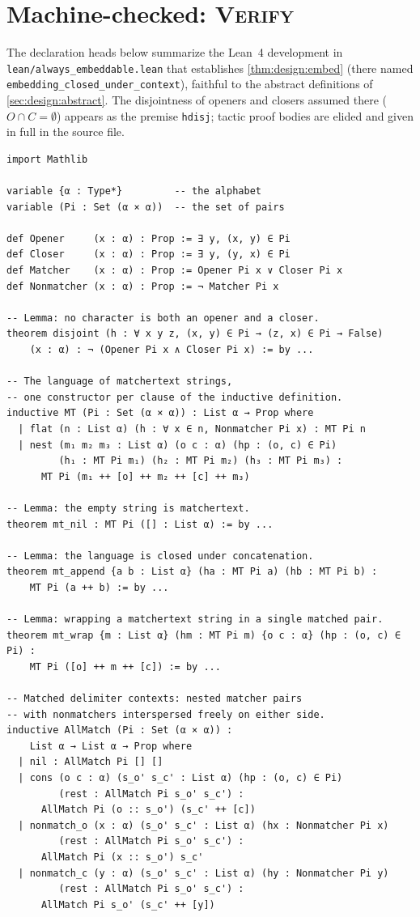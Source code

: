 \section{Machine-checked: \textsc{Verify}}
\label{app:lean}

The declaration heads below summarize the Lean~4 development in
\nolinkurl{lean/always_embeddable.lean} that establishes \cref{thm:design:embed}
(there named \texttt{embedding\_closed\_under\_context}),
faithful to the abstract definitions of \cref{sec:design:abstract}.
The disjointness of openers and closers assumed there ($O \cap C = \emptyset$)
appears as the premise \texttt{hdisj};
tactic proof bodies are elided and given in full in the source file.

\begin{lstlisting}
import Mathlib

variable {α : Type*}         -- the alphabet
variable (Pi : Set (α × α))  -- the set of pairs

def Opener     (x : α) : Prop := ∃ y, (x, y) ∈ Pi
def Closer     (x : α) : Prop := ∃ y, (y, x) ∈ Pi
def Matcher    (x : α) : Prop := Opener Pi x ∨ Closer Pi x
def Nonmatcher (x : α) : Prop := ¬ Matcher Pi x

-- Lemma: no character is both an opener and a closer.
theorem disjoint (h : ∀ x y z, (x, y) ∈ Pi → (z, x) ∈ Pi → False)
    (x : α) : ¬ (Opener Pi x ∧ Closer Pi x) := by ...

-- The language of matchertext strings,
-- one constructor per clause of the inductive definition.
inductive MT (Pi : Set (α × α)) : List α → Prop where
  | flat (n : List α) (h : ∀ x ∈ n, Nonmatcher Pi x) : MT Pi n
  | nest (m₁ m₂ m₃ : List α) (o c : α) (hp : (o, c) ∈ Pi)
         (h₁ : MT Pi m₁) (h₂ : MT Pi m₂) (h₃ : MT Pi m₃) :
      MT Pi (m₁ ++ [o] ++ m₂ ++ [c] ++ m₃)

-- Lemma: the empty string is matchertext.
theorem mt_nil : MT Pi ([] : List α) := by ...

-- Lemma: the language is closed under concatenation.
theorem mt_append {a b : List α} (ha : MT Pi a) (hb : MT Pi b) :
    MT Pi (a ++ b) := by ...

-- Lemma: wrapping a matchertext string in a single matched pair.
theorem mt_wrap {m : List α} (hm : MT Pi m) {o c : α} (hp : (o, c) ∈ Pi) :
    MT Pi ([o] ++ m ++ [c]) := by ...

-- Matched delimiter contexts: nested matcher pairs
-- with nonmatchers interspersed freely on either side.
inductive AllMatch (Pi : Set (α × α)) :
    List α → List α → Prop where
  | nil : AllMatch Pi [] []
  | cons (o c : α) (s_o' s_c' : List α) (hp : (o, c) ∈ Pi)
         (rest : AllMatch Pi s_o' s_c') :
      AllMatch Pi (o :: s_o') (s_c' ++ [c])
  | nonmatch_o (x : α) (s_o' s_c' : List α) (hx : Nonmatcher Pi x)
         (rest : AllMatch Pi s_o' s_c') :
      AllMatch Pi (x :: s_o') s_c'
  | nonmatch_c (y : α) (s_o' s_c' : List α) (hy : Nonmatcher Pi y)
         (rest : AllMatch Pi s_o' s_c') :
      AllMatch Pi s_o' (s_c' ++ [y])


\end{lstlisting}
